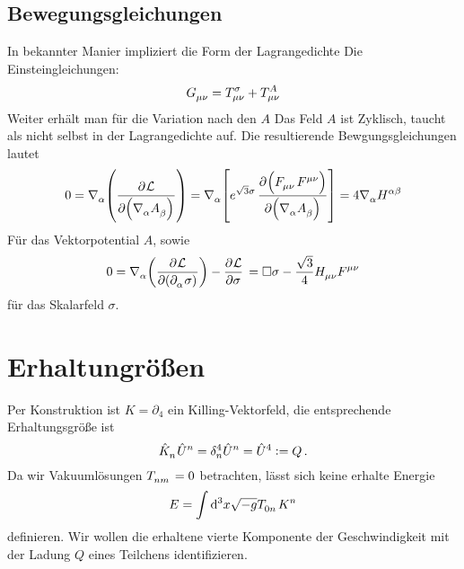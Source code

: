 \subsection{Bewegungsgleichungen}
In bekannter Manier impliziert die Form der Lagrangedichte 
Die Einsteingleichungen:
\begin{equation}
\tensor{G}{_\mu_\nu}=\tensor*{T}{*^{\sigma}_\mu_\nu}+\tensor*{T}{*^{A}*_\mu*_\nu}
\end{equation}
Weiter erhält man für die Variation nach den $A$ 
Das Feld $A$ ist Zyklisch, taucht als nicht selbst in der Lagrangedichte auf.
Die resultierende Bewgungsgleichungen lautet
\begin{equation}
0=\tensor{\nabla}{_\alpha}\left(\dpd{\mathcal{L}}{\left(\tensor{\nabla}{_\alpha}\tensor{A}{_\beta}\right)}\right)
=\tensor{\nabla}{_\alpha}\left[e^{\sqrt{3}\sigma}\dpd{\left(\tensor{F}{_\mu_\nu}\tensor{F}{^\mu^\nu}\right)}{\left(\tensor{\nabla}{_\alpha}\tensor{A}{_\beta}\right)}\right]
=4\tensor{\nabla}{_\alpha}\tensor{H}{^\alpha^\beta}
 \end{equation}
 Für das Vektorpotential $A$, sowie
 \begin{equation}
0=\tensor{\nabla}{_\alpha}\left(\dpd{\mathcal{L}}{\left(\tensor{\partial}{_\alpha}\sigma\right)}\right)
-\dpd{\mathcal{L}}{\sigma}\\
=\square \sigma
-\frac{\sqrt{3}}{4}\tensor*{H}{_\mu_\nu}\tensor*{F}{^\mu^\nu}
\label{eq:dymdilat}
 \end{equation}
 für das Skalarfeld $\sigma$. 
\section{Erhaltungrößen}
Per Konstruktion ist $K=\partial_4$ ein Killing-Vektorfeld, die entsprechende
Erhaltungsgröße ist 
\begin{equation}
\tensor{\hat{K}}{_n}\tensor{\hat{U}}{^n}=\tensor*{\delta}{^4_n}\tensor{\hat{U}}{^n}
=\tensor{\hat{U}}{^4}:=Q\,.
\end{equation}
Da wir Vakuumlösungen $\tensor{T}{_n_m}=0$ betrachten, lässt sich keine erhalte
Energie 
\begin{equation}
E=\int\dif{}^3x \sqrt{-g} \tensor{T}{_0_n}\tensor{K}{^n}
\end{equation}
definieren. Wir wollen die erhaltene vierte Komponente der Geschwindigkeit mit 
der Ladung $Q$ eines Teilchens identifizieren.
